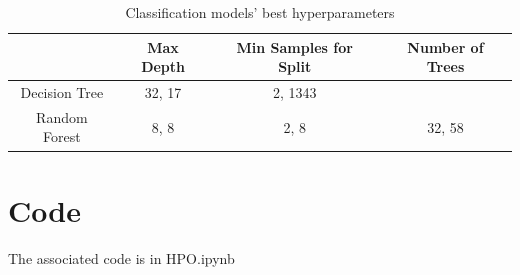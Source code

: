 \documentclass[12pt, letterpaper]{article}
\begin{document}
\begin{table}[H]
\centering
\caption{Classification models' best hyperparameters}
\label{cls_table 3}
\begin{tabular}{c|c|c|c} %
                & Max Depth     & Min Samples for Split     & Number of Trees \\ \hline
Decision Tree   & 32, 17 & 2, 1343 \\
Random Forest   & 8, 8 & 2, 8 & 32, 58 \\
\end{tabular}
\end{table}

\section{Code} %

The associated code is in HPO.ipynb
\end{document}
